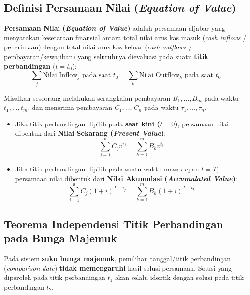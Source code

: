 \documentclass[11pt,a4paper]{article}
\begin{document}
\subsection{Definisi Persamaan Nilai (\textit{Equation of Value})}

\begin{definitionbox}
\textbf{Persamaan Nilai (\textit{Equation of Value})} adalah persamaan aljabar yang menyatakan kesetaraan finansial antara total nilai arus kas masuk (\textit{cash inflows} / penerimaan) dengan total nilai arus kas keluar (\textit{cash outflows} / pembayaran/kewajiban) yang seluruhnya dievaluasi pada suatu \textbf{titik perbandingan} ($t = t_0$):
\begin{equation}
    \sum_{j} \text{Nilai Inflow}_j \text{ pada saat } t_0 = \sum_{k} \text{Nilai Outflow}_k \text{ pada saat } t_0
\end{equation}
\end{definitionbox}

Misalkan seseorang melakukan serangkaian pembayaran $B_1, \dots, B_m$ pada waktu $t_1, \dots, t_m$, dan menerima pembayaran $C_1, \dots, C_n$ pada waktu $\tau_1, \dots, \tau_n$.
\begin{itemize}[leftmargin=1.5em]
    \item Jika titik perbandingan dipilih pada \textbf{saat kini ($t = 0$)}, persamaan nilai dibentuk dari \textbf{Nilai Sekarang (\textit{Present Value})}:
    \begin{equation}
        \sum_{j=1}^n C_j v^{\tau_j} = \sum_{k=1}^m B_k v^{t_k}
    \end{equation}
    \item Jika titik perbandingan dipilih pada suatu waktu masa depan \textbf{$t = T$}, persamaan nilai dibentuk dari \textbf{Nilai Akumulasi (\textit{Accumulated Value})}:
    \begin{equation}
        \sum_{j=1}^n C_j (1 + i)^{T - \tau_j} = \sum_{k=1}^m B_k (1 + i)^{T - t_k}
    \end{equation}
\end{itemize}

\subsection{Teorema Independensi Titik Perbandingan pada Bunga Majemuk}

\begin{definitionbox}
Pada sistem \textbf{suku bunga majemuk}, pemilihan tanggal/titik perbandingan (\textit{comparison date}) \textbf{tidak memengaruhi} hasil solusi persamaan. Solusi yang diperoleh pada titik perbandingan $t_1$ akan selalu identik dengan solusi pada titik perbandingan $t_2$.
\end{definitionbox}
\end{document}
